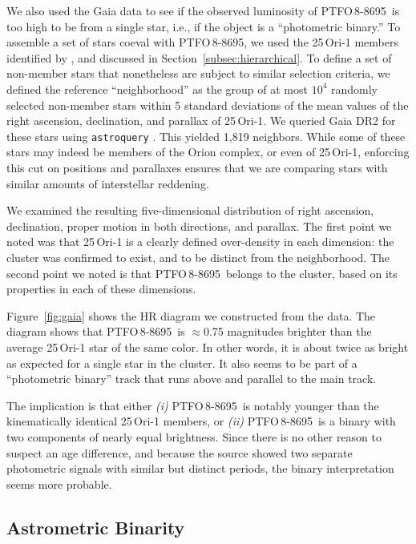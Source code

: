 \documentclass[12pt,twocolumn,tighten]{aastex62}
\newcommand{\ptfo}{PTFO$\,$8-8695}
\begin{document}
We also used the Gaia data to see if the observed luminosity of \ptfo\
is too high to be from a single star, i.e., if the object is a
``photometric binary.'' To assemble a set of stars coeval with \ptfo,
we used the 25$\,$Ori-1 members identified by
\citet{kounkel_apogee2_2018}, and discussed in
Section~\ref{subsec:hierarchical}.  To define a set of non-member
stars that nonetheless are subject to similar selection criteria, we
defined the reference ``neighborhood'' as the group of at most $10^4$
randomly selected non-member stars within 5 standard deviations of the
mean values of the right ascension, declination, and parallax of
25$\,$Ori-1.  We queried Gaia DR2 for these stars using
\texttt{astroquery} \citep{astroquery_2018}.  This yielded 1{,}819
neighbors.  While some of these stars may indeed be members of the
Orion complex, or even of 25$\,$Ori-1, enforcing this cut on positions
and parallaxes ensures that we are comparing stars with similar
amounts of interstellar reddening.

We examined the resulting five-dimensional distribution of right
ascension, declination, proper motion in both directions, and
parallax.  The first point we noted was that 25$\,$Ori-1 is a clearly
defined over-density in each dimension: the cluster was confirmed to
exist, and to be distinct from the neighborhood.  The second point we
noted is that \ptfo\ belongs to the cluster, based on its properties
in each of these dimensions.

Figure~\ref{fig:gaia} shows the HR diagram we constructed from the
data.  The diagram shows that \ptfo\ is $\approx$0.75 magnitudes
brighter than the average 25$\,$Ori-1 star of the same color.  In
other words, it is about twice as bright as expected for a single star
in the cluster.  It also seems to be part of a ``photometric binary''
track that runs above and parallel to the main track.

The implication is that either {\it (i)} \ptfo\ is notably younger
than the kinematically identical 25$\,$Ori-1 members, or {\it (ii)}
\ptfo\ is a binary with two components of nearly equal brightness.
Since there is no other reason to suspect an age difference, and
because the source showed two separate photometric signals with
similar but distinct periods, the binary interpretation seems more
probable.

\subsection{Astrometric Binarity}
\end{document}
